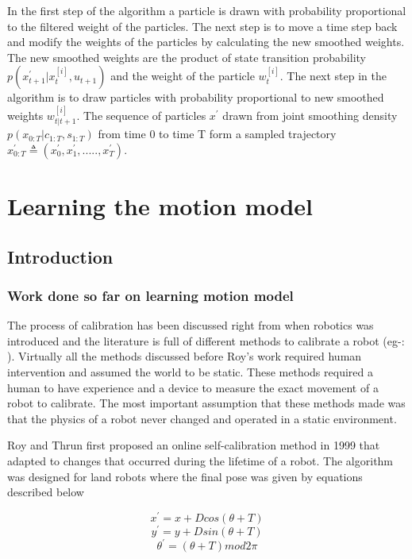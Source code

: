 \documentclass[12pt,draft]{dalcsthesis}
\begin{document}
In the first step of the algorithm a particle is drawn with probability proportional to the filtered weight of the particles. The next step is to move a time step back and modify the weights of the particles by calculating the new smoothed weights. The new smoothed weights are the product of state transition probability $p(x ^{'} _{t+1}|x_{t}^{[i]},u _{t+1})$ and the weight of the particle $w_{t}^{[i]}$. The next step in the algorithm is to draw particles with probability proportional to new smoothed weights $w_{t|t+1}^{[i]}$.  The sequence of particles $x^{'}$ drawn from joint smoothing density $p(x_{0:T}|c_{1:T},s_{1:T})$ from time 0 to time T form a sampled trajectory $x^{'}_{0:T} \triangleq (x^{'}_0,x^{'}_1,.....,x^{'}_T)$.
 
\chapter{Learning the motion model}
\label{learning the motion model}
\section{Introduction}
\subsection{Work done so far on learning motion model}
The process of calibration has been discussed right from when robotics was introduced and the literature is full of different methods to calibrate a robot (eg-: \cite{cox1990autonomous} \cite{vukobratovic1989introduction}). Virtually all the methods discussed before Roy's work \cite{Roy} required human intervention and assumed the world to be static. These methods required a human to have experience and a device to measure the exact movement of a robot to calibrate. The most important assumption that these methods made was that the physics of a robot never changed and operated in a static environment. 

Roy and Thrun first proposed an online self-calibration method \cite{Roy} in 1999 that adapted to changes that occurred during the lifetime of a robot. The algorithm was designed for land robots where the final pose was given by equations described below

\begin{equation}
x^{'}=x+Dcos(\theta+T)
\end{equation}
\begin{equation}
y^{'}=y+Dsin(\theta+T)
\end{equation}
\begin{equation}
\theta^{'}=(\theta+T)mod2\pi
\end{equation}
\end{document}
